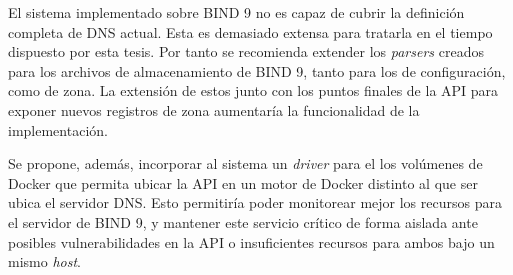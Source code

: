 \begin{recomendations}
El sistema implementado sobre BIND 9 no es capaz de cubrir la definición completa de DNS actual. Esta es demasiado extensa para tratarla en el tiempo dispuesto por esta tesis. Por tanto se recomienda extender los \textit{parsers} creados para los archivos de almacenamiento de BIND 9, tanto para los de configuración, como de zona. La extensión de estos junto con los puntos finales de la API para exponer nuevos registros de zona aumentaría la funcionalidad de la implementación.

Se propone, además, incorporar al sistema un \textit{driver} para el los volúmenes de Docker que permita ubicar la API en un motor de Docker distinto al que ser ubica el servidor DNS. Esto permitiría poder monitorear mejor los recursos para el servidor de BIND 9, y mantener este servicio crítico de forma aislada ante posibles vulnerabilidades en la API o insuficientes recursos para ambos bajo un mismo \textit{host}.
\end{recomendations}
